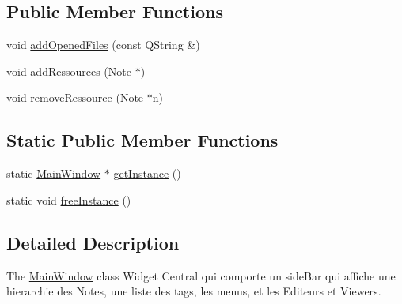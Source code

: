 \subsection*{Public Member Functions}
\begin{DoxyCompactItemize}
\item 
void \hyperlink{class_main_window_a6e4779ee3aff03b85cab6895d69da4ed}{add\-Opened\-Files} (const Q\-String \&)
\item 
void \hyperlink{class_main_window_a15201fac954b5ac5e8ba8a60912061e3}{add\-Ressources} (\hyperlink{class_note}{Note} $\ast$)
\item 
void \hyperlink{class_main_window_ad0c9cafacdb1ad166787470373d230f0}{remove\-Ressource} (\hyperlink{class_note}{Note} $\ast$n)
\end{DoxyCompactItemize}
\subsection*{Static Public Member Functions}
\begin{DoxyCompactItemize}
\item 
static \hyperlink{class_main_window}{Main\-Window} $\ast$ \hyperlink{class_main_window_adbe77fe06e8ee3324c38577a79b4eed6}{get\-Instance} ()
\item 
static void \hyperlink{class_main_window_afdf126bf06f3b9828eb6653cc3d37603}{free\-Instance} ()
\end{DoxyCompactItemize}


\subsection{Detailed Description}
The \hyperlink{class_main_window}{Main\-Window} class Widget Central qui comporte un side\-Bar qui affiche une hierarchie des Notes, une liste des tags, les menus, et les Editeurs et Viewers. 

